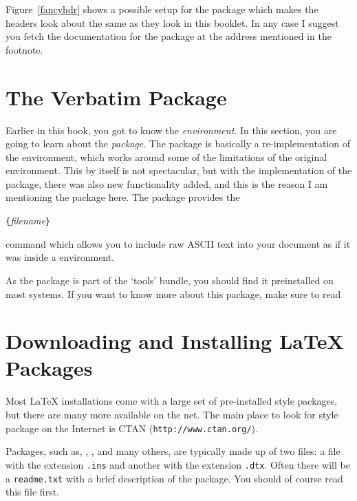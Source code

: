  
Figure~\ref{fancyhdr} shows a possible setup for the 
package which makes the headers look about the same as they look in
this booklet. In any case I suggest you fetch the documentation for
the package at the address mentioned in the footnote. 

\section{The Verbatim Package}

Earlier in this book, you got to know the 
\emph{environment}.  In this section, you are going to learn about the
 \emph{package}. The  package is basically
a re-implementation of the  environment, which works around
some of the limitations of the original  environment.
This by itself is not spectacular, but with the implementation of the
 package, there was also new functionality added, and
this is the reason I am mentioning the package here. The 
package provides the

\begin{lscommand}
\verb|{|\emph{filename}\verb|}|
\end{lscommand}

\noindent command which allows you to include raw ASCII text into your
document as if it was inside a  environment.

As the  package is part of the `tools' bundle, you
should find it preinstalled on most systems. If you want to know more
about this package, make sure to read \cite{verbatim} 


\section{Downloading and Installing \LaTeX{} Packages}

Most \LaTeX{} installations come with a large set of pre-installed
style packages, but there are many more available on the net. The main
place to look for style package on the Internet is CTAN (\verb|http://www.ctan.org/|).

Packages, such as, , , and many
others, are typically made up of two files: a file with the extension
\texttt{.ins} and another with the extension \texttt{.dtx}. Often
there will be a \texttt{readme.txt} with a brief description of the
package. You should of course read this file first.

